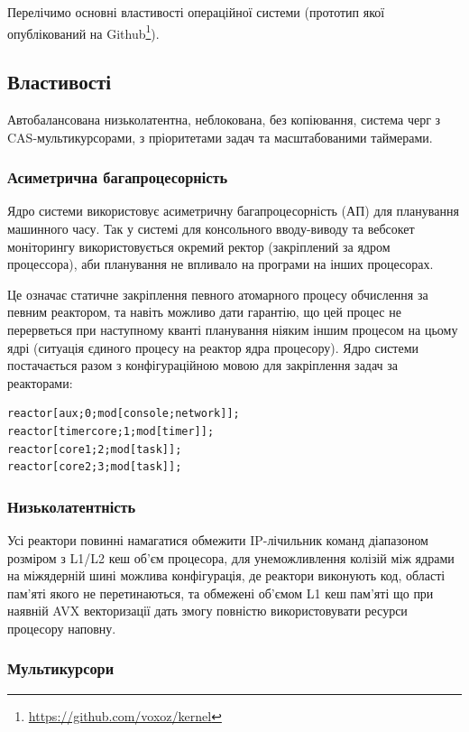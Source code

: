 \begin{definition}
\begin{definition}
\begin{definition}
\begin{definition}
Перелічимо основні властивості операційної системи (прототип
якої опублікований на Github\footnote{\url{https://github.com/voxoz/kernel}}).

\subsection{Властивості}

Автобалансована низьколатентна, неблокована, без копіювання, система черг
з CAS-мультикурсорами, з пріоритетами задач та масштабованими таймерами.

\subsubsection{Асиметрична багапроцесорність}

Ядро системи використовує асиметричну багапроцесорність (АП)
для планування машинного часу. Так у системі для консольного
вводу-виводу та вебсокет моніторингу використовується окремий
ректор (закріплений за ядром процессора),
аби планування не впливало на програми на інших процесорах.

Це означає статичне закріплення певного атомарного процесу
обчислення за певним реактором, та навіть можливо дати гарантію, що
цей процес не перерветься при наступному кванті планування
ніяким іншим процесом на цьому ядрі (ситуація єдиного процесу
на реактор ядра процесору). Ядро системи постачається разом з конфігураційною
мовою для закріплення задач за реакторами:

\begin{lstlisting}
reactor[aux;0;mod[console;network]];
reactor[timercore;1;mod[timer]];
reactor[core1;2;mod[task]];
reactor[core2;3;mod[task]];
\end{lstlisting}

\subsubsection{Низьколатентність}

Усі реактори повинні намагатися обмежити IP-лічильник команд
діапазоном розміром з L1/L2 кеш об'єм процесора, для унеможливлення
колізій між ядрами на міжядерній шині можлива конфігурація, де
реактори виконують код, області пам'яті якого не перетинаються,
та обмежені об'ємом L1 кеш пам'яті що при наявній AVX векторизації
дать змогу повністю використовувати ресурси процесору наповну.

\newpage
\subsubsection{Мультикурсори}


\end{definition}
\end{definition}
\end{definition}
\end{definition}
